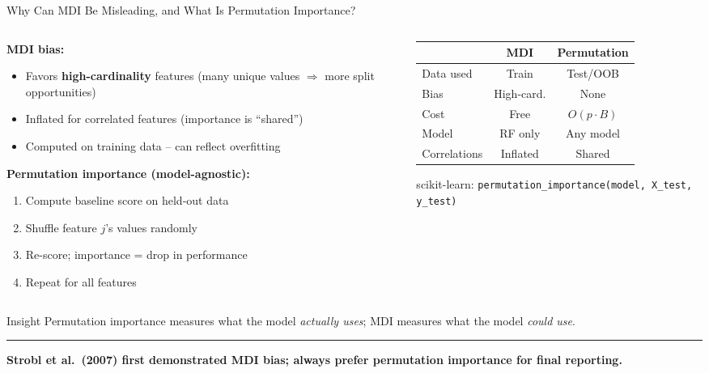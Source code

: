 \documentclass[8pt,aspectratio=169]{beamer}
\newcommand{\bottomnote}[1]{%
\vfill
\vspace{-2mm}
\textcolor{mllavender2}{\rule{\textwidth}{0.4pt}}
\vspace{1mm}
\footnotesize
\textbf{#1}
}
\newenvironment{compactlist}{%
  \begin{itemize}%
    \setlength{\itemsep}{2pt}%
    \setlength{\parskip}{0pt}%
    \setlength{\parsep}{0pt}%
}{%
  \end{itemize}%
}
\newcommand{\highlight}[1]{\textcolor{mlorange}{\textbf{#1}}}
\begin{document}
\begin{frame}{Why Can MDI Be Misleading, and What Is Permutation Importance?}
\begin{columns}[T]
\begin{column}{0.55\textwidth}
\small
\textbf{MDI bias:}
\begin{compactlist}
\item Favors \highlight{high-cardinality} features (many unique values $\Rightarrow$ more split opportunities)
\item Inflated for correlated features (importance is ``shared'')
\item Computed on training data -- can reflect overfitting
\end{compactlist}

\vspace{0.3em}
\footnotesize
\textbf{Permutation importance (model-agnostic):}
\begin{enumerate}
\setlength{\itemsep}{1pt}
\item Compute baseline score on held-out data
\item Shuffle feature $j$'s values randomly
\item Re-score; importance = drop in performance
\item Repeat for all features
\end{enumerate}
\end{column}
\begin{column}{0.42\textwidth}
\footnotesize
\renewcommand{\arraystretch}{1.2}
\begin{tabular}{@{}lcc@{}}
\toprule
& \textbf{MDI} & \textbf{Permutation} \\
\midrule
Data used & Train & Test/OOB \\
Bias & High-card. & None \\
Cost & Free & $O(p \cdot B)$ \\
Model & RF only & Any model \\
Correlations & Inflated & Shared \\
\bottomrule
\end{tabular}

\vspace{0.5em}
\scriptsize scikit-learn: \texttt{permutation\_importance(model, X\_test, y\_test)}
\end{column}
\end{columns}

\begin{block}{Insight}
\scriptsize Permutation importance measures what the model \emph{actually uses}; MDI measures what the model \emph{could use}.
\end{block}
\bottomnote{Strobl et al.\ (2007) first demonstrated MDI bias; always prefer permutation importance for final reporting.}
\end{frame}
\end{document}
